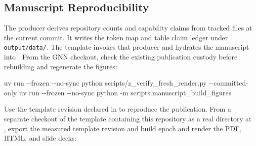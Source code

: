 \documentclass[
  english,
  9pt,
]{extarticle}
\newenvironment{Shaded}{}{}
\newcommand{\AttributeTok}[1]{\textcolor[rgb]{0.49,0.56,0.16}{#1}}
\newcommand{\BuiltInTok}[1]{\textcolor[rgb]{0.00,0.50,0.00}{#1}}
\newcommand{\DataTypeTok}[1]{\textcolor[rgb]{0.56,0.13,0.00}{#1}}
\newcommand{\ExtensionTok}[1]{#1}
\newcommand{\FunctionTok}[1]{\textcolor[rgb]{0.02,0.16,0.49}{#1}}
\newcommand{\NormalTok}[1]{#1}
\newcommand{\OperatorTok}[1]{\textcolor[rgb]{0.40,0.40,0.40}{#1}}
\newcommand{\StringTok}[1]{\textcolor[rgb]{0.25,0.44,0.63}{#1}}
\newcommand{\VariableTok}[1]{\textcolor[rgb]{0.10,0.09,0.49}{#1}}
\begin{document}
\subsection{Manuscript
Reproducibility}\label{manuscript-reproducibility}

The producer derives repository counts and capability claims from
tracked files at the current commit. It writes the token map and table
claim ledger under \texttt{output/data/}. The template invokes that
producer and hydrates the manuscript into .
From the GNN checkout, check the existing publication custody before
rebuilding and regenerate the figures:

\begin{Shaded}
\begin{Highlighting}[]
\ExtensionTok{uv}\NormalTok{ run }\AttributeTok{{-}{-}frozen} \AttributeTok{{-}{-}no{-}sync}\NormalTok{ python scripts/z\_verify\_fresh\_render.py }\AttributeTok{{-}{-}committed{-}only}
\ExtensionTok{uv}\NormalTok{ run }\AttributeTok{{-}{-}frozen} \AttributeTok{{-}{-}no{-}sync}\NormalTok{ python }\AttributeTok{{-}m}\NormalTok{ scripts.manuscript\_build\_figures}
\end{Highlighting}
\end{Shaded}

Use the template revision declared in
 to reproduce the
publication. From a separate checkout of the template containing this
repository as a real directory at
, export the
measured template revision and build epoch and render the PDF, HTML, and
slide decks:

\begin{Shaded}
\end{Shaded}
\end{document}
